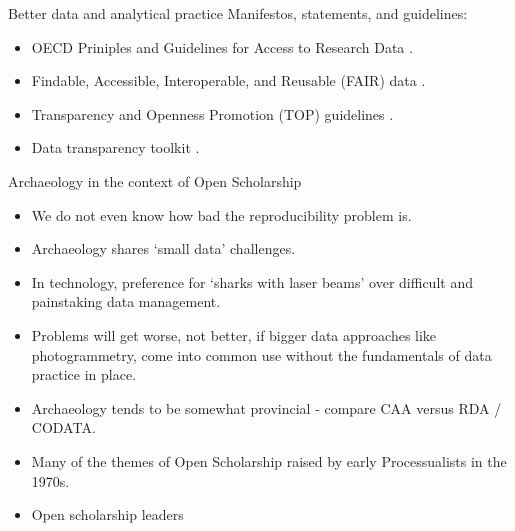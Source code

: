 \documentclass[aspectratio=169, 11pt]{beamer} %
\begin{document}
\begin{frame}{Better data and analytical practice}
  Manifestos, statements, and guidelines:
    \begin{itemize}[label=\textbullet]
        \item OECD Priniples and Guidelines for Access to Research Data \cite{Oecd2007-vi}.
        \item Findable, Accessible, Interoperable, and Reusable (FAIR) data \cite{Wilkinson2016-mr, Go-fair2017-vs}.
        \item Transparency and Openness Promotion (TOP) guidelines \cite{Nosek2015-wm, Cos2019-mr}.
        \item Data transparency toolkit \cite{Perkel2018-rw}.
    \end{itemize}
\end{frame}

\begin{frame}{Archaeology in the context of Open Scholarship}
    \begin{itemize}[label=\textbullet]
        \item We do not even know how bad the reproducibility problem is.
        \item Archaeology shares `small data' challenges.
        \item In technology, preference for `sharks with laser beams' over difficult and painstaking data management. 
        \item Problems will get worse, not better, if bigger data approaches like photogrammetry, come into common use without the fundamentals of data practice in place.
        \item Archaeology tends to be somewhat provincial - compare CAA versus RDA / CODATA. 
        \item Many of the themes of Open Scholarship raised by early Processualists in the 1970s. \cite{Hole1973-cy} 
        \item Open scholarship leaders \cite{Kansa2010-qx, Kintigh2006-wa, Marwick2017-bz}
    \end{itemize}
\end{frame}
\end{document}
